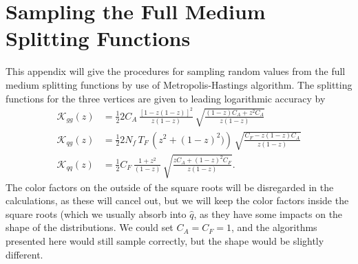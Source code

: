 \documentclass[main.tex]{subfiles}
\begin{document}
\section{Sampling the Full Medium Splitting Functions}\label{app: medium_MetropolisHastings}
This appendix will give the procedures for sampling random values from the full medium splitting functions by use of Metropolis-Hastings algorithm. The splitting functions for the three vertices are given to leading logarithmic accuracy by \cite{Universal_quark_gluon_ratio_in_medium-induced_parton_cascade}
\begin{align}
    \mathcal{K}_{gg}(z) &= \frac{1}{2} 2 C_A \, \frac{[1-z(1-z)]^2}{z(1-z)} \, \sqrt{\frac{(1-z)C_A + z^2 C_A}{z(1-z)}} \label{eqn: medium_full_splittingfunctions_gg} \\
    \mathcal{K}_{qg}(z) &= \frac{1}{2} 2 N_f \, T_F \, \left(z^2 +(1-z)^2)\right) \, \sqrt{\frac{C_F - z(1-z)C_A}{z(1-z)}} \label{eqn: medium_full_splittingfunctions_qg} \\
    \mathcal{K}_{qq}(z) &= \frac{1}{2} C_F \, \frac{1+z^2}{(1-z)} \, \sqrt{\frac{zC_A + (1-z)^2 C_F}{z(1-z)}}. \label{eqn: medium_full_splittingfunctions_qq}
\end{align}
The color factors on the outside of the square roots will be disregarded in the calculations, as these will cancel out, but we will keep the color factors inside the square roots (which we usually absorb into \(\hat q\), as they have some impacts on the shape of the distributions. We could set \(C_A=C_F=1\), and the algorithms presented here would still sample correctly, but the shape would be slightly different. 
\end{document}
